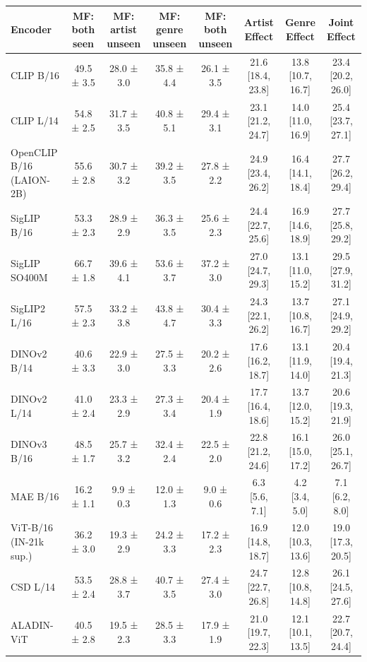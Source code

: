 \begin{tabular}{lccccccc}
\toprule
Encoder & MF: both seen & MF: artist unseen & MF: genre unseen & MF: both unseen & Artist Effect & Genre Effect & Joint Effect \\
\midrule
CLIP B/16 & 49.5 ± 3.5 & 28.0 ± 3.0 & 35.8 ± 4.4 & 26.1 ± 3.5 & 21.6 [18.4, 23.8] & 13.8 [10.7, 16.7] & 23.4 [20.2, 26.0] \\
CLIP L/14 & 54.8 ± 2.5 & 31.7 ± 3.5 & 40.8 ± 5.1 & 29.4 ± 3.1 & 23.1 [21.2, 24.7] & 14.0 [11.0, 16.9] & 25.4 [23.7, 27.1] \\
OpenCLIP B/16 (LAION-2B) & 55.6 ± 2.8 & 30.7 ± 3.2 & 39.2 ± 3.5 & 27.8 ± 2.2 & 24.9 [23.4, 26.2] & 16.4 [14.1, 18.4] & 27.7 [26.2, 29.4] \\
SigLIP B/16 & 53.3 ± 2.3 & 28.9 ± 2.9 & 36.3 ± 3.5 & 25.6 ± 2.3 & 24.4 [22.7, 25.6] & 16.9 [14.6, 18.9] & 27.7 [25.8, 29.2] \\
SigLIP SO400M & 66.7 ± 1.8 & 39.6 ± 4.1 & 53.6 ± 3.7 & 37.2 ± 3.0 & 27.0 [24.7, 29.3] & 13.1 [11.0, 15.2] & 29.5 [27.9, 31.2] \\
SigLIP2 L/16 & 57.5 ± 2.3 & 33.2 ± 3.8 & 43.8 ± 4.7 & 30.4 ± 3.3 & 24.3 [22.1, 26.2] & 13.7 [10.8, 16.7] & 27.1 [24.9, 29.2] \\
DINOv2 B/14 & 40.6 ± 3.3 & 22.9 ± 3.0 & 27.5 ± 3.3 & 20.2 ± 2.6 & 17.6 [16.2, 18.7] & 13.1 [11.9, 14.0] & 20.4 [19.4, 21.3] \\
DINOv2 L/14 & 41.0 ± 2.4 & 23.3 ± 2.9 & 27.3 ± 3.4 & 20.4 ± 1.9 & 17.7 [16.4, 18.6] & 13.7 [12.0, 15.2] & 20.6 [19.3, 21.9] \\
DINOv3 B/16 & 48.5 ± 1.7 & 25.7 ± 3.2 & 32.4 ± 2.4 & 22.5 ± 2.0 & 22.8 [21.2, 24.6] & 16.1 [15.0, 17.2] & 26.0 [25.1, 26.7] \\
MAE B/16 & 16.2 ± 1.1 & 9.9 ± 0.3 & 12.0 ± 1.3 & 9.0 ± 0.6 & 6.3 [5.6, 7.1] & 4.2 [3.4, 5.0] & 7.1 [6.2, 8.0] \\
ViT-B/16 (IN-21k sup.) & 36.2 ± 3.0 & 19.3 ± 2.9 & 24.2 ± 3.3 & 17.2 ± 2.3 & 16.9 [14.8, 18.7] & 12.0 [10.3, 13.6] & 19.0 [17.3, 20.5] \\
CSD L/14 & 53.5 ± 2.4 & 28.8 ± 3.7 & 40.7 ± 3.5 & 27.4 ± 3.0 & 24.7 [22.7, 26.8] & 12.8 [10.8, 14.8] & 26.1 [24.5, 27.6] \\
ALADIN-ViT & 40.5 ± 2.8 & 19.5 ± 2.3 & 28.5 ± 3.3 & 17.9 ± 1.9 & 21.0 [19.7, 22.3] & 12.1 [10.1, 13.5] & 22.7 [20.7, 24.4] \\
\bottomrule
\end{tabular}
